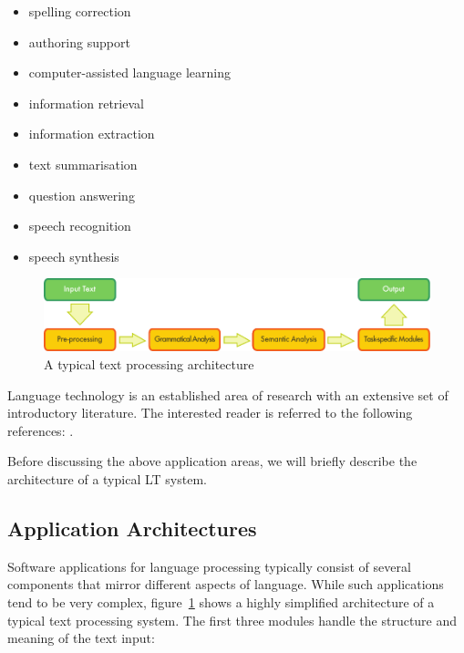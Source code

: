 \begin{multicols}{2}
  \begin{itemize}
  \item spelling correction
  \item authoring support
  \item computer-assisted language learning
  \item information retrieval 
  \item information extraction
  \item text summarisation
  \item question answering
  \item speech recognition 
  \item speech synthesis 
  \end{itemize}

  \begin{figure}[b]
    \center
    \includegraphics[width=\textwidth]{../_media/english/text_processing_app_architecture}
    \caption{A typical text processing architecture}
    \label{fig:textprocessingarch_en}
  \end{figure}

  Language technology is an established area of research with an extensive set of introductory literature. The interested reader is referred to the following references:  \cite{jurafsky-martin01, manning-schuetze1, lt-world1, lt-survey1}.

  Before discussing the above application areas, we will briefly describe the architecture of a typical LT system.

  \subsection{Application Architectures}

  Software applications for language processing typically consist of several components that mirror different aspects of language. While such applications tend to be very complex, figure~\ref{fig:textprocessingarch_en} shows a highly simplified architecture of a typical text processing system. The first three modules handle the structure and meaning of the text input:


\end{multicols}

